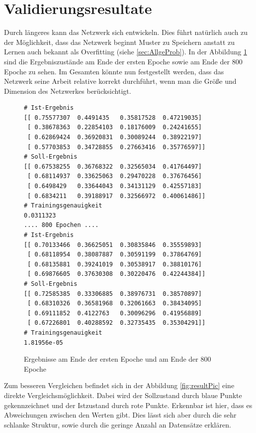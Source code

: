 \section{Validierungsresultate}

Durch längeres kann das Netzwerk sich entwickeln. 
Dies führt natürlich auch zu der Möglichkeit, dass das Netzwerk beginnt Muster zu Speichern anstatt zu Lernen auch bekannt als Overfitting (siehe \ref{sec:AllgeProb}). 
In der Abbildung \ref{fig:runns} sind die Ergebniszustände am Ende der ersten Epoche sowie am Ende der $800$ Epoche zu sehen. 
Im Gesamten könnte nun festgestellt werden, dass das Netzwerk seine Arbeit relative korrekt durchführt, wenn man die Größe und Dimension des Netzwerkes berücksichtigt. 
\begin{figure}[ht!]
\lstset{language=Python}
\begin{lstlisting}
# Ist-Ergebnis 
[[ 0.75577307  0.4491435   0.35817528  0.47219035]
 [ 0.38678363  0.22854103  0.18176009  0.24241655]
 [ 0.62869424  0.36920831  0.30089244  0.38922197]
 [ 0.57703853  0.34728855  0.27663416  0.35776597]]
# Soll-Ergebnis
[[ 0.67538255  0.36768322  0.32565034  0.41764497]
 [ 0.68114937  0.33625063  0.29470228  0.37676456]
 [ 0.6498429   0.33644043  0.34131129  0.42557183]
 [ 0.6834211   0.39188917  0.32566972  0.40061486]]
# Trainingsgenauigkeit
0.0311323
.... 800 Epochen ....
# Ist-Ergebnis
[[ 0.70133466  0.36625051  0.30835846  0.35559893]
 [ 0.68118954  0.38087887  0.30591199  0.37864769]
 [ 0.68135881  0.39241019  0.30538917  0.38810176]
 [ 0.69876605  0.37630308  0.30220476  0.42244384]]
# Soll-Ergebnis
[[ 0.72585385  0.33306885  0.38976731  0.38570897]
 [ 0.68310326  0.36581968  0.32061663  0.38434095]
 [ 0.69111852  0.4122763   0.30096296  0.41956889]
 [ 0.67226801  0.40288592  0.32735435  0.35304291]]
# Trainingsgenauigkeit
1.81956e-05
\end{lstlisting}
	\caption{Ergebnisse am Ende der ersten Epoche und am Ende der $800$ Epoche}
	\label{fig:runns}
\end{figure}
Zum besseren Vergleichen befindet sich in der Abbildung \ref{fig:resultPic} eine direkte Vergleichsmöglichkeit. 
Dabei wird der Sollzustand durch blaue Punkte gekennzeichnet und der Istzustand durch rote Punkte. 
Erkennbar ist hier, dass es Abweichungen zwischen den Werten gibt. 
Dies lässt sich aber durch die sehr schlanke Struktur, sowie durch die geringe Anzahl an Datensätze erklären. 
